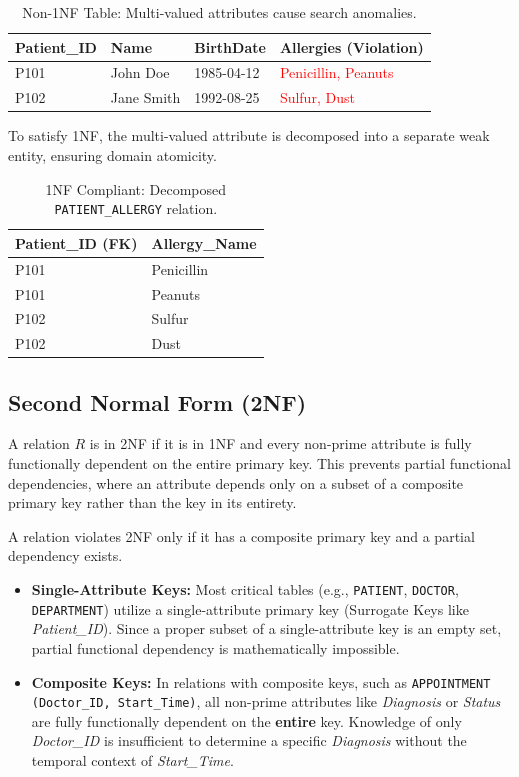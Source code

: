 \documentclass[12pt,a4paper]{article}
\begin{document}
\begin{table}[h]
	\centering
	\begin{tabular}{llll}
		\toprule
		\textbf{Patient\_ID} & \textbf{Name} & \textbf{BirthDate} & \textbf{Allergies (Violation)}       \\
		\midrule
		P101                 & John Doe      & 1985-04-12         & \textcolor{red}{Penicillin, Peanuts} \\
		P102                 & Jane Smith    & 1992-08-25         & \textcolor{red}{Sulfur, Dust}        \\
		\bottomrule
	\end{tabular}
	\caption{Non-1NF Table: Multi-valued attributes cause search anomalies.}
\end{table}
To satisfy 1NF, the multi-valued attribute is decomposed into a separate weak entity, ensuring domain atomicity.

\begin{table}[h]
	\centering
	\begin{tabular}{ll}
		\toprule
		\textbf{Patient\_ID (FK)} & \textbf{Allergy\_Name} \\
		\midrule
		P101                      & Penicillin             \\
		P101                      & Peanuts                \\
		P102                      & Sulfur                 \\
		P102                      & Dust                   \\
		\bottomrule
	\end{tabular}
	\caption{1NF Compliant: Decomposed \texttt{PATIENT\_ALLERGY} relation.}
\end{table}


\subsection{Second Normal Form (2NF)}
A relation $R$ is in 2NF if it is in 1NF and every non-prime attribute is fully functionally dependent on the entire primary key. This prevents partial functional dependencies, where an attribute depends only on a subset of a composite primary key rather than the key in its entirety.

A relation violates 2NF only if it has a composite primary key and a partial dependency exists.
\begin{itemize}[label=$\bullet$]
	\item \textbf{Single-Attribute Keys:} Most critical tables (e.g., \texttt{PATIENT}, \texttt{DOCTOR}, \texttt{DEPARTMENT}) utilize a single-attribute primary key (Surrogate Keys like \textit{Patient\_ID}). Since a proper subset of a single-attribute key is an empty set, partial functional dependency is mathematically impossible.
	\item \textbf{Composite Keys:} In relations with composite keys, such as \texttt{APPOINTMENT (Doctor\_ID, Start\_Time)}, all non-prime attributes like \textit{Diagnosis} or \textit{Status} are fully functionally dependent on the \textbf{entire} key. Knowledge of only \textit{Doctor\_ID} is insufficient to determine a specific \textit{Diagnosis} without the temporal context of \textit{Start\_Time}.
\end{itemize}
\end{document}
